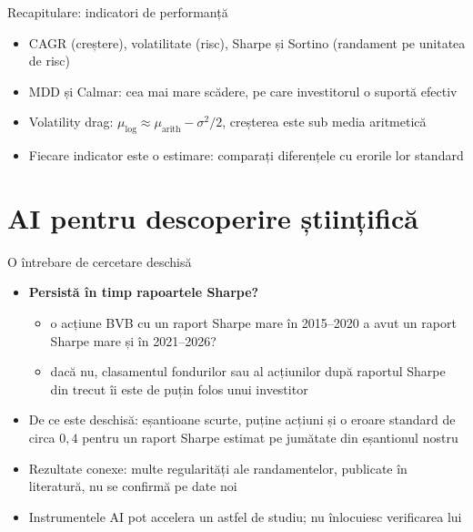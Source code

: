 \begin{frame}{Recapitulare: indicatori de performanță}
\itemsize{\small}
\begin{itemize}
    \item CAGR (creștere), volatilitate (risc), Sharpe și Sortino (randament pe unitatea de risc)
    \item MDD și Calmar: cea mai mare scădere, pe care investitorul o suportă efectiv
    \item Volatility drag: $\mu_{\text{log}} \approx \mu_{\text{arith}} - \sigma^2/2$, creșterea este sub media aritmetică
    \item Fiecare indicator este o estimare: comparați diferențele cu erorile lor standard
\end{itemize}
\end{frame}


\section{AI pentru descoperire științifică}

\begin{frame}{O întrebare de cercetare deschisă}
\itemsize{\small}
\begin{itemize}
    \item \textbf{Persistă în timp rapoartele Sharpe?}
    \begin{itemize}
        \item o acțiune BVB cu un raport Sharpe mare în 2015--2020 a avut un raport Sharpe mare și în 2021--2026?
        \item dacă nu, clasamentul fondurilor sau al acțiunilor după raportul Sharpe din trecut îi este de puțin folos unui investitor
    \end{itemize}
    \item De ce este deschisă: eșantioane scurte, puține acțiuni și o eroare standard de circa $0{,}4$ pentru un raport Sharpe estimat pe jumătate din eșantionul nostru
    \item Rezultate conexe: multe regularități ale randamentelor, publicate în literatură, nu se confirmă pe date noi 
    \item Instrumentele AI pot accelera un astfel de studiu; nu înlocuiesc verificarea lui 
\end{itemize}
\end{frame}

